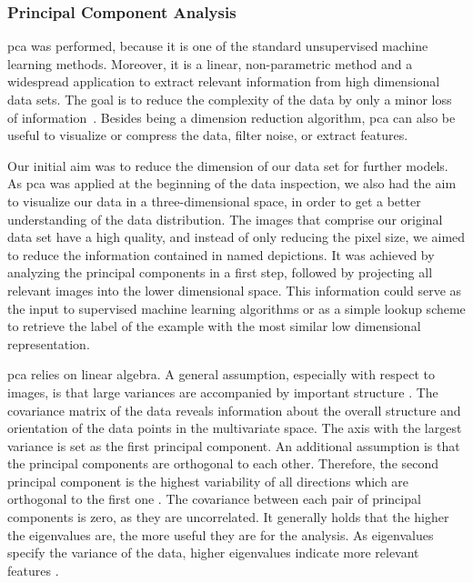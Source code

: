 \subsubsection{Principal Component Analysis}
\label{subsec:PCA}

\acrlong{pca} was performed, because it is one of the standard unsupervised machine learning methods. Moreover, it is a linear, non-parametric method and a widespread application to extract relevant information from high dimensional data sets. The goal is to reduce the complexity of the data by only a minor loss of information~\citep{shlens2014}. Besides being a dimension reduction algorithm, \acrshort{pca} can also be useful to visualize or compress the data, filter noise, or extract features.

\bigskip
Our initial aim was to reduce the dimension of our data set for further models. As \acrshort{pca} was applied at the beginning of the data inspection, we also had the aim to visualize our data in a three-dimensional space, in order to get a better understanding of the data distribution. The images that comprise our original data set have a high quality, and instead of only reducing the pixel size, we aimed to reduce the information contained in named depictions. It was achieved by analyzing the principal components in a first step, followed by projecting all relevant images into the lower dimensional space. This information could serve as the input to supervised machine learning algorithms or as a simple lookup scheme to retrieve the label of the example with the most similar low dimensional representation.

\bigskip
\acrshort{pca} relies on linear algebra. A general assumption, especially with respect to images, is that large variances are accompanied by important structure \citep{shlens2014}. The covariance matrix of the data reveals information about the overall structure and orientation of the data points in the multivariate space. The axis with the largest variance is set as the first principal component. An additional assumption is that the principal components are orthogonal to each other. Therefore, the second principal component is the highest variability of all directions which are orthogonal to the first one \citep{bohling2006}. The covariance between each pair of principal components is zero, as they are uncorrelated. It generally holds that the higher the eigenvalues are, the more useful they are for the analysis. As eigenvalues specify the variance of the data, higher eigenvalues indicate more relevant features \citep{shlens2014}.

